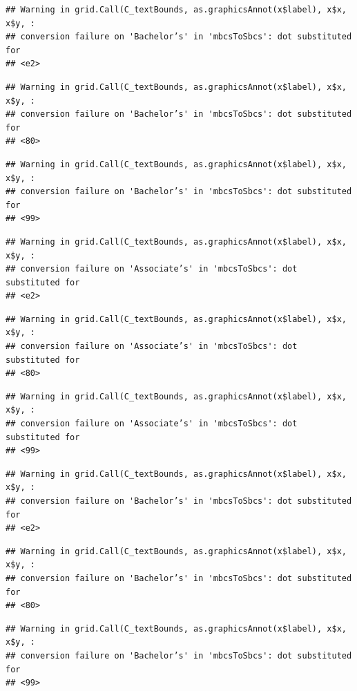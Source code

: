 \documentclass[
]{article}
\begin{document}
\begin{verbatim}
## Warning in grid.Call(C_textBounds, as.graphicsAnnot(x$label), x$x, x$y, :
## conversion failure on 'Bachelor’s' in 'mbcsToSbcs': dot substituted for
## <e2>
\end{verbatim}

\begin{verbatim}
## Warning in grid.Call(C_textBounds, as.graphicsAnnot(x$label), x$x, x$y, :
## conversion failure on 'Bachelor’s' in 'mbcsToSbcs': dot substituted for
## <80>
\end{verbatim}

\begin{verbatim}
## Warning in grid.Call(C_textBounds, as.graphicsAnnot(x$label), x$x, x$y, :
## conversion failure on 'Bachelor’s' in 'mbcsToSbcs': dot substituted for
## <99>
\end{verbatim}

\begin{verbatim}
## Warning in grid.Call(C_textBounds, as.graphicsAnnot(x$label), x$x, x$y, :
## conversion failure on 'Associate’s' in 'mbcsToSbcs': dot substituted for
## <e2>
\end{verbatim}

\begin{verbatim}
## Warning in grid.Call(C_textBounds, as.graphicsAnnot(x$label), x$x, x$y, :
## conversion failure on 'Associate’s' in 'mbcsToSbcs': dot substituted for
## <80>
\end{verbatim}

\begin{verbatim}
## Warning in grid.Call(C_textBounds, as.graphicsAnnot(x$label), x$x, x$y, :
## conversion failure on 'Associate’s' in 'mbcsToSbcs': dot substituted for
## <99>
\end{verbatim}

\begin{verbatim}
## Warning in grid.Call(C_textBounds, as.graphicsAnnot(x$label), x$x, x$y, :
## conversion failure on 'Bachelor’s' in 'mbcsToSbcs': dot substituted for
## <e2>
\end{verbatim}

\begin{verbatim}
## Warning in grid.Call(C_textBounds, as.graphicsAnnot(x$label), x$x, x$y, :
## conversion failure on 'Bachelor’s' in 'mbcsToSbcs': dot substituted for
## <80>
\end{verbatim}

\begin{verbatim}
## Warning in grid.Call(C_textBounds, as.graphicsAnnot(x$label), x$x, x$y, :
## conversion failure on 'Bachelor’s' in 'mbcsToSbcs': dot substituted for
## <99>
\end{verbatim}
\end{document}
